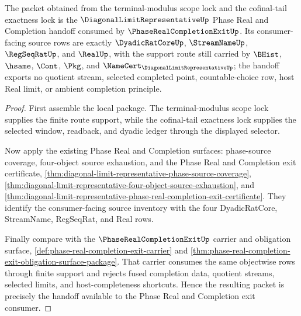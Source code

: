\begin{theorem}
\label{thm:diagonal-limit-representative-phase-exit-handoff-lock}
The packet obtained from the terminal-modulus scope lock and the cofinal-tail exactness lock is the $\DiagonalLimitRepresentativeUp$ Phase Real and Completion handoff consumed by $\PhaseRealCompletionExitUp$. Its consumer-facing source rows are exactly $\DyadicRatCoreUp$, $\StreamNameUp$, $\RegSeqRatUp$, and $\RealUp$, with the support route still carried by $\BHist$, $\hsame$, $\Cont$, $\Pkg$, and $\NameCert_{\DiagonalLimitRepresentativeUp}$; the handoff exports no quotient stream, selected completed point, countable-choice row, host Real limit, or ambient completion principle.
\end{theorem}
\begin{proof}
First assemble the local package. The terminal-modulus scope lock supplies the finite route support, while the cofinal-tail exactness lock supplies the selected window, readback, and dyadic ledger through the displayed selector.

Now apply the existing Phase Real and Completion surfaces: phase-source coverage, four-object source exhaustion, and the Phase Real and Completion exit certificate, \autoref{thm:diagonal-limit-representative-phase-source-coverage}, \autoref{thm:diagonal-limit-representative-four-object-source-exhaustion}, and \autoref{thm:diagonal-limit-representative-phase-real-completion-exit-certificate}. They identify the consumer-facing source inventory with the four DyadicRatCore, StreamName, RegSeqRat, and Real rows.

Finally compare with the $\PhaseRealCompletionExitUp$ carrier and obligation surface, \autoref{def:phase-real-completion-exit-carrier} and \autoref{thm:phase-real-completion-exit-obligation-surface-package}. That carrier consumes the same objectwise rows through finite support and rejects fused completion data, quotient streams, selected limits, and host-completeness shortcuts. Hence the resulting packet is precisely the handoff available to the Phase Real and Completion exit consumer.
\end{proof}
